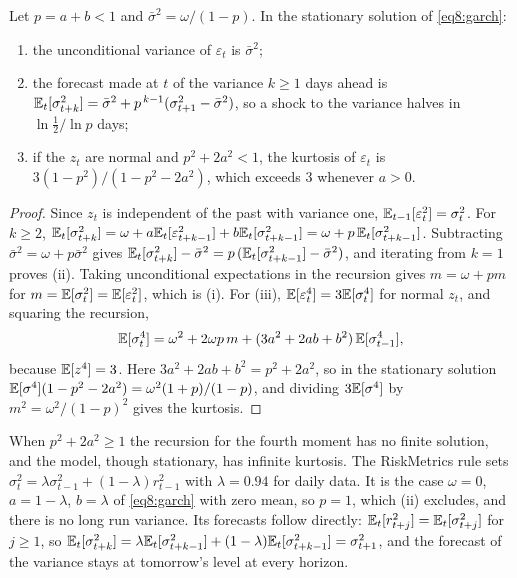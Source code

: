 \begin{chapterrefs}
\begin{proposition}\label{prop8:garch}
Let $p=a+b<1$ and $\bar\sigma^2=\omega/(1-p)$. In the stationary solution of \cref{eq8:garch}:
\begin{enumerate}[label=(\roman*)]
  \item the unconditional variance of $\varepsilon_t$ is $\bar\sigma^2$;
  \item the forecast made at $t$ of the variance $k\ge1$ days ahead is
  $\mathbb{E}_t[\sigma_{t+k}^2]=\bar\sigma^2+p^{\,k-1}(\sigma_{t+1}^2-\bar\sigma^2)$, so a shock to the variance
  halves in $\ln\tfrac12/\ln p$ days;
  \item if the $z_t$ are normal and $p^2+2a^2<1$, the kurtosis of $\varepsilon_t$ is
  $3(1-p^2)/(1-p^2-2a^2)$, which exceeds 3 whenever $a>0$.
\end{enumerate}
\end{proposition}
\begin{proof}
Since $z_t$ is independent of the past with variance one, $\mathbb{E}_{t-1}[\varepsilon_t^2]=\sigma_t^2$. For
$k\ge2$, $\mathbb{E}_t[\sigma_{t+k}^2]=\omega+a\mathbb{E}_t[\varepsilon_{t+k-1}^2]+b\mathbb{E}_t[\sigma_{t+k-1}^2]
=\omega+p\,\mathbb{E}_t[\sigma_{t+k-1}^2]$. Subtracting $\bar\sigma^2=\omega+p\bar\sigma^2$ gives
$\mathbb{E}_t[\sigma_{t+k}^2]-\bar\sigma^2=p\,(\mathbb{E}_t[\sigma_{t+k-1}^2]-\bar\sigma^2)$, and iterating from $k=1$
proves (ii). Taking unconditional expectations in the recursion gives $m=\omega+pm$ for
$m=\mathbb{E}[\sigma_t^2]=\mathbb{E}[\varepsilon_t^2]$, which is (i). For (iii), $\mathbb{E}[\varepsilon_t^4]=3\mathbb{E}[\sigma_t^4]$ for
normal $z_t$, and squaring the recursion,
\[
  \mathbb{E}[\sigma_t^4]=\omega^2+2\omega p\,m+(3a^2+2ab+b^2)\,\mathbb{E}[\sigma_{t-1}^4],
\]
because $\mathbb{E}[z^4]=3$. Here $3a^2+2ab+b^2=p^2+2a^2$, so in the stationary solution
$\mathbb{E}[\sigma^4](1-p^2-2a^2)=\omega^2(1+p)/(1-p)$, and dividing $3\mathbb{E}[\sigma^4]$ by $m^2=\omega^2/(1-p)^2$
gives the kurtosis.
\end{proof}

When $p^2+2a^2\ge1$ the recursion for the fourth moment has no finite solution, and the model, though
stationary, has infinite kurtosis. The RiskMetrics rule \parencite{riskmetrics1996} sets
$\sigma_t^2=\lambda\sigma_{t-1}^2+(1-\lambda)r_{t-1}^2$ with $\lambda=0.94$ for daily data. It is the
case $\omega=0$, $a=1-\lambda$, $b=\lambda$ of \cref{eq8:garch} with zero mean, so $p=1$, which (ii)
excludes, and there is no long run variance. Its forecasts follow directly: $\mathbb{E}_t[r_{t+j}^2]=\mathbb{E}_t[\sigma_{t+j}^2]$
for $j\ge1$, so $\mathbb{E}_t[\sigma_{t+k}^2]=\lambda\mathbb{E}_t[\sigma_{t+k-1}^2]+(1-\lambda)\mathbb{E}_t[\sigma_{t+k-1}^2]=\sigma_{t+1}^2$, and the
forecast of the variance stays at tomorrow's level at every horizon.


\end{chapterrefs}
